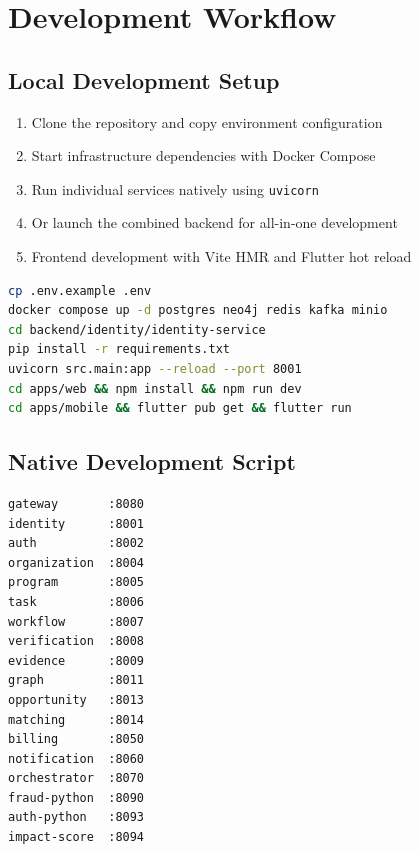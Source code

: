 \documentclass[11pt,a4paper]{article}
\begin{document}
\clearpage

\section{Development Workflow}

\subsection{Local Development Setup}

\begin{enumerate}
  \item Clone the repository and copy environment configuration
  \item Start infrastructure dependencies with Docker Compose
  \item Run individual services natively using \texttt{uvicorn}
  \item Or launch the combined backend for all-in-one development
  \item Frontend development with Vite HMR and Flutter hot reload
\end{enumerate}

\begin{lstlisting}[language=bash, caption=Development Setup Commands]
cp .env.example .env
docker compose up -d postgres neo4j redis kafka minio
cd backend/identity/identity-service
pip install -r requirements.txt
uvicorn src.main:app --reload --port 8001
cd apps/web && npm install && npm run dev
cd apps/mobile && flutter pub get && flutter run
\end{lstlisting}

\subsection{Native Development Script}

\begin{lstlisting}[language=bash, caption=Native Port Assignments]
gateway       :8080
identity      :8001
auth          :8002
organization  :8004
program       :8005
task          :8006
workflow      :8007
verification  :8008
evidence      :8009
graph         :8011
opportunity   :8013
matching      :8014
billing       :8050
notification  :8060
orchestrator  :8070
fraud-python  :8090
auth-python   :8093
impact-score  :8094
\end{lstlisting}
\end{document}
